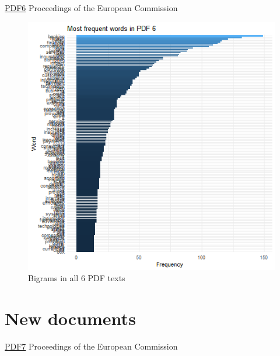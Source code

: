 \documentclass[
]{book}
\begin{document}
\href{https://data.consilium.europa.eu/doc/document/ST-13026-2020-INIT/en/pdf}{PDF6}
Proceedings of the European Commission

\begin{figure}

{\centering \includegraphics[width=0.8\linewidth]{img/freqP6} 

}

\caption{Bigrams in all 6 PDF texts}\label{fig:nice-figF6}
\end{figure}

\hypertarget{new-documents}{%
\section{New documents}\label{new-documents}}

\href{https://data.consilium.europa.eu/doc/document/ST-13026-2020-INIT/en/pdf}{PDF7}
Proceedings of the European Commission
\end{document}
